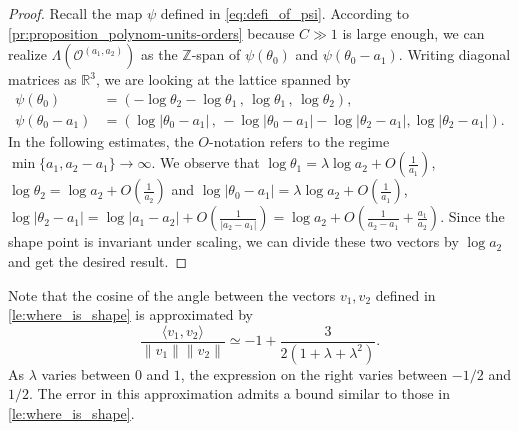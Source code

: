\documentclass[11pt,letterpaper]{amsart}
\theoremstyle{definition}
\theoremstyle{remark}
\begin{document}
	\begin{proof}
		Recall the map $\psi$ defined in \cref{eq:defi_of_psi}.
		According to \cref{pr:proposition_polynom-units-orders} because $C \gg 1$ is large enough, we can realize $\Lambda(\mathcal{O}^{(a_1,a_2)})$ as the $\mathbb{Z}$-span of $\psi(\theta_0)$ and $\psi(\theta_0-a_1)$. Writing diagonal matrices as $\mathbb{R}^{3}$, we are looking at the lattice spanned by 
		\begin{align}
			\psi(\theta_0) & =  \left( -\log \theta_2 -\log \theta_1 \,,\, \log\theta_1 \,,\, \log\theta_2\right) ,\\
			\psi(\theta_0 - a_1) & =  \left( \log|\theta_0 - a_1| \, , \, -\log|\theta_0 - a_1| -\log|\theta_2 - a_1| , \log|\theta_2 - a_1|  \right) .
		\end{align}
		In the following estimates, the $O$-notation refers to the regime $\min\{a_1,a_2-a_1\}\to\infty$.
		We observe that $\log \theta_1 = \lambda \log a_2 + O(\frac{1}{a_1})$, $\log \theta_2 = \log a_2  + O(\frac{1}{a_2})$ and $\log|\theta_0 - a_1|=\lambda\log a_2+O(\frac{1}{a_1})  $, $\log|\theta_2-a_1|= \log |a_1-a_2|  + O(\frac{1}{|a_2-a_1|}) = \log a_2 + O(\frac{1}{a_2-a_1} + \frac{a_1}{a_2})$. Since the shape point is invariant under scaling, we can divide these two vectors by $\log a_2$ and get the desired result.
	\end{proof}
	
	Note that the {cosine of the angle} between the vectors $v_1,v_2$ defined in \cref{le:where_is_shape} is {approximated by}
	\begin{equation}
		\label{eq:angle}
		\frac{\langle v_1 , v_2 \rangle}{\|v_1\| \|v_2\|} \simeq  -1+\frac{3}{2(1+\lambda + \lambda^{2})}.
	\end{equation}
	As $\lambda$ varies between $0$ and $1$, the expression on the right varies between $-1/2$ and $1/2$. The error in this approximation admits a bound similar to those in \cref{le:where_is_shape}.
	
\end{document}
